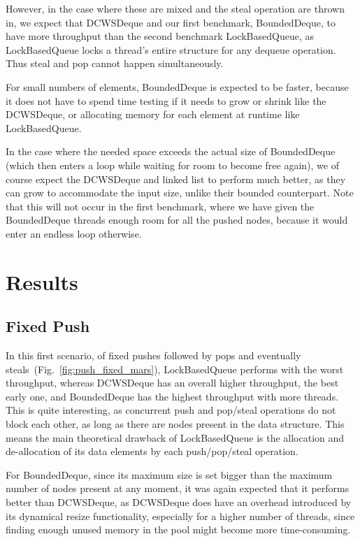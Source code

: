 \documentclass [10pt]{scrartcl}
\begin{document}
   However, in the case where these are mixed and the steal operation are thrown in, we expect that DCWSDeque and our first benchmark, BoundedDeque, to have more throughput than the second benchmark LockBasedQueue, as LockBasedQueue locks a thread's entire structure for any dequeue operation. Thus steal and pop cannot happen simultaneously.
   
   For small numbers of elements, BoundedDeque is expected to be faster, because it does not have to spend time testing if it needs to grow or shrink like the DCWSDeque, or allocating memory for each element at runtime like LockBasedQueue.
   
   In the case where the needed space exceeds the actual size of BoundedDeque (which then enters a loop while waiting for room to become free again), we of course expect the DCWSDeque and linked list to perform much better, as they can grow to accommodate the input size, unlike their bounded counterpart. Note that this will not occur in the first benchmark, where we have given the BoundedDeque threads enough room for all the pushed nodes, because it would enter an endless loop otherwise.
   
   
   \section{Results}
   
   \subsection{Fixed Push}
   In this first scenario, of fixed pushes followed by pops and eventually steals~(Fig.~\ref{fig:push_fixed_mars}), LockBasedQueue performs with the worst throughput,
   whereas DCWSDeque has an overall higher throughput, the best early one, and BoundedDeque has the highest throughput with more threads.
   This is quite interesting, as concurrent push and pop/steal operations do not block each other, as long as there are nodes present in the data structure. 
   This means the main theoretical drawback of LockBasedQueue is the allocation and de-allocation of its data elements by each push/pop/steal operation.
   
   For BoundedDeque, since its maximum size is set bigger than the maximum number of nodes present at any moment, it was again expected that it performs better than DCWSDeque, as DCWSDeque does have an overhead introduced by its dynamical resize functionality, especially for a higher number of threads, since finding enough unused memory in the pool might become more time-consuming.
   
\end{document}
